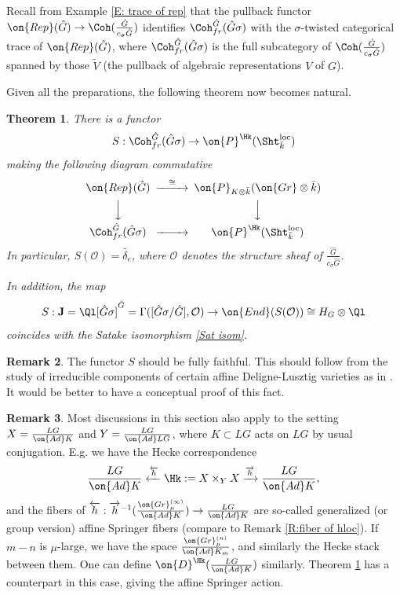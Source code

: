 \documentclass[11pt]{amsart}
\newtheorem{thm}{Theorem}[subsection]
\theoremstyle{definition}
\theoremstyle{definition}
\newtheorem{rmk}[thm]{Remark}
\theoremstyle{definition}
\numberwithin{equation}{subsection}
\newcommand{\mO}{{\mathcal O}}
\newcommand{\Ad}{{\on{Ad}}}
\newcommand{\End}{{\on{End}}}
\newcommand{\Gr}{{\on{Gr}}}
\newcommand{\loc}{\mathrm{loc}}
\begin{document}
Recall from Example \ref{E: trace of rep} that the pullback functor $\on{Rep}(\hat G)\to \Coh(\frac{\hat G}{c_\sigma\hat G})$ identifies $\Coh_{fr}^{\hat G}(\hat G\sigma)$ with the $\sigma$-twisted categorical trace of $\on{Rep}(\hat G)$, where
$\Coh_{fr}^{\hat G}(\hat G\sigma)$ is the full subcategory of $\Coh(\frac{\hat G}{c_\sigma\hat G})$ spanned by those $\widetilde{V}$ (the pullback of algebraic representations $V$ of $G$). 

Given all the preparations, the following theorem now becomes natural.
\begin{thm}
\label{T: trace of geom Sat}
There is a functor
\[S: \Coh_{fr}^{\hat G}(\hat G\sigma)\to \on{P}^{\Hk}(\Sht^\loc_{\bar k})\]
making the following diagram commutative
\[
\begin{CD}
\on{Rep}(\hat G)@>\cong>>\on{P}_{K\otimes \bar k}(\Gr\otimes \bar k)\\
@VVV@VVV\\
\Coh_{fr}^{\hat G}(\hat G\sigma)@>>> \on{P}^{\Hk}(\Sht^\loc_{\bar k})
\end{CD}
\]
In particular, $S(\mO)=\widetilde{\delta_e}$, where $\mO$ denotes the structure sheaf of $\frac{\hat G}{c_\sigma \hat G}$.
 
In addition, the map
\[S: \mathbf J=\Ql[\hat G\sigma]^{\hat G}=\Gamma([\hat G\sigma/\hat G],\mO)\to \End(S(\mO))\cong H_G\otimes \Ql\]
coincides with the Satake isomorphism \eqref{Sat isom}.
\end{thm}

\begin{rmk}
The functor $S$ should be fully faithful. This should follow from the study of irreducible components of certain affine Deligne-Lusztig varieties as in \cite[\S 4]{XZ}. It would be better to have a conceptual proof of this fact.
\end{rmk}

\begin{rmk}
\label{R:affine springer}
Most discussions in this section also apply to the setting
$X=\frac{LG}{\Ad K}$ and $Y=\frac{LG}{\Ad LG}$, where $K\subset LG$ acts on $LG$ by usual conjugation. E.g. we have the Hecke correspondence
\[\frac{LG}{\Ad K}\xleftarrow{\overleftarrow{h}}\Hk:= X\times_YX\xrightarrow{\overrightarrow{h}}\frac{LG}{\Ad K},\]
and the fibers of $\overleftarrow{h}: \overrightarrow{h}^{-1}(\frac{\Gr_\mu^{(\infty)}}{\Ad K})\to \frac{LG}{\Ad K}$ are so-called generalized (or group version) affine Springer fibers (compare to Remark \ref{R:fiber of hloc}).  
If $m-n$ is $\mu$-large, we have the space
$\frac{\Gr_\mu^{(n)}}{\Ad K_m}$, and similarly the Hecke stack between them. One can define $\on{D}^{\Hk}(\frac{LG}{\Ad K})$ similarly. Theorem \ref{T: trace of geom Sat} has a counterpart in this case, giving the affine Springer action.
\end{rmk}
\end{document}
